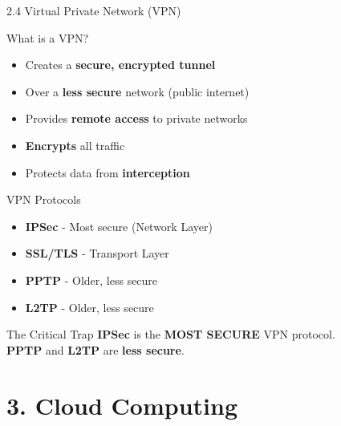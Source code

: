 \documentclass{beamer}
\begin{document}
	\begin{frame}{2.4 Virtual Private Network (VPN)}
		\begin{block}{What is a VPN?}
			\begin{itemize}
				\item Creates a \textbf{secure, encrypted tunnel}
				\item Over a \textbf{less secure} network (public internet)
				\item Provides \textbf{remote access} to private networks
				\item \textbf{Encrypts} all traffic
				\item Protects data from \textbf{interception}
			\end{itemize}
		\end{block}
		
		\begin{block}{VPN Protocols}
			\begin{itemize}
				\item \textbf{IPSec} - Most secure (Network Layer)
				\item \textbf{SSL/TLS} - Transport Layer
				\item \textbf{PPTP} - Older, less secure
				\item \textbf{L2TP} - Older, less secure
			\end{itemize}
		\end{block}
		
		\begin{alertblock}{The Critical Trap}
			\textbf{IPSec} is the \textbf{MOST SECURE} VPN protocol. \\
			\textbf{PPTP} and \textbf{L2TP} are \textbf{less secure}.
		\end{alertblock}
	\end{frame}
	
	\section{3. Cloud Computing}
	
\end{document}
